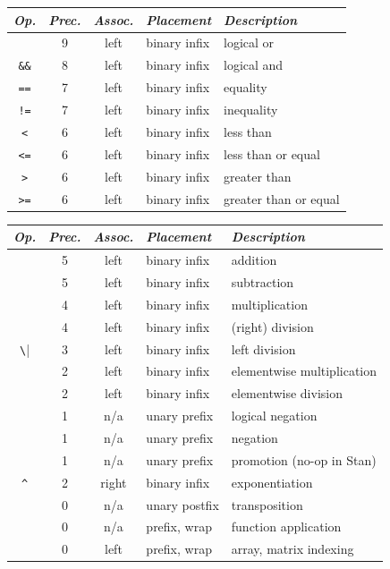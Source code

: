 \documentclass[10pt]{report}
\begin{document}
%
\vfill
\noindent\spc
{\footnotesize
  \begin{tabular}{c|ccl|l}
    {\it Op.} & {\it Prec.} & {\it Assoc.} & {\it
      Placement} & {\it Description}
    \\ \hline \hline
    \code{||} & 9 & left & binary infix & logical or
    \\ \hline
    \Verb|&&| & 8 & left & binary infix & logical and
    \\ \hline
    \Verb|==| & 7 & left & binary infix & equality
    \\
    \Verb|!=| & 7 & left & binary infix & inequality
    \\ \hline
    \Verb|<| & 6 & left & binary infix & less than
    \\
    \Verb|<=| & 6 & left & binary infix & less than or equal
    \\
    \Verb|>| & 6 & left & binary infix & greater than
    \\
    \Verb|>=| & 6 & left & binary infix & greater than or equal
  \end{tabular}
}
\vfill
\vfill


%
\vfill
\noindent\spc
{\footnotesize
  \begin{tabular}{c|ccl|l}
    {\it Op.} & {\it Prec.} & {\it Assoc.} & {\it
      Placement} & {\it Description}
    \\ \hline \hline

    \code{+} & 5 & left & binary infix & addition
    \\
    \code{-} & 5 & left & binary infix & subtraction
    \\ \hline
    \code{*} & 4 & left & binary infix & multiplication
    \\
    \code{/} & 4 & left & binary infix & (right) division
    \\ \hline
    \Verb|\| & 3 & left & binary infix & left division
    \\ \hline
    \code{.*} & 2 & left & binary infix & elementwise multiplication
    \\
    \code{./} & 2 & left & binary infix & elementwise division
    \\ \hline
    \code{!} & 1 & n/a & unary prefix & logical negation
    \\
    \code{-} & 1 & n/a & unary prefix & negation
    \\
    \code{+} & 1 & n/a & unary prefix & promotion (no-op in Stan)
    \\ \hline
    \Verb|^| & 2 & right & binary infix & exponentiation
    \\ \hline
    \code{'} & 0 & n/a & unary postfix & transposition
    \\ \hline \hline
    \code{()} & 0 & n/a & prefix, wrap & function application
    \\
    \code{[]} & 0 & left & prefix, wrap & array, matrix indexing
  \end{tabular}
}
\end{document}
